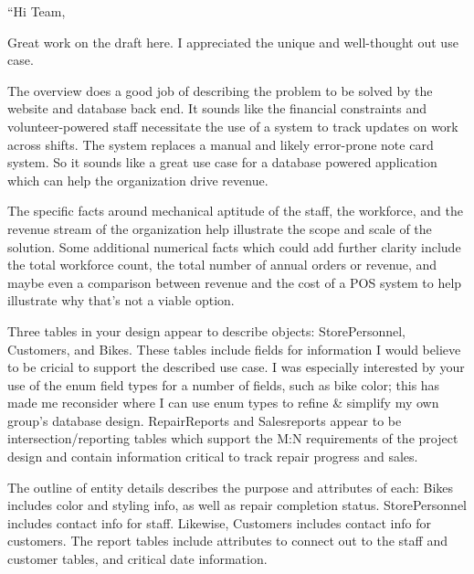\documentclass{article}
\begin{document}
\begin{tcolorbox}[colback=secondarycolor, colframe=primarycolor, title=\textbf{Step 1: Peer Review 2 - Andrew Mathena}]
``Hi Team,

\vspace{0.2cm}

Great work on the draft here. I appreciated the unique and well-thought out use case. 

\vspace{0.2cm}

The overview does a good job of describing the problem to be solved by the website and database back end. It sounds like the financial constraints and volunteer-powered staff necessitate the use of a system to track updates on work across shifts. The system replaces a manual and likely error-prone note card system. So it sounds like a great use case for a database powered application which can help the organization drive revenue.

\vspace{0.2cm}

The specific facts around mechanical aptitude of the staff, the workforce, and the revenue stream of the organization help illustrate the scope and scale of the solution. Some additional numerical facts which could add further clarity include the total workforce count, the total number of annual orders or revenue, and maybe even a comparison between revenue and the cost of a POS system to help illustrate why that's not a viable option.

\vspace{0.2cm}

Three tables in your design appear to describe objects: StorePersonnel, Customers, and Bikes. These tables include fields for information I would believe to be cricial to support the described use case. I was especially interested by your use of the enum field types for a number of fields, such as bike color; this has made me reconsider where I can use enum types to refine \& simplify my own group's database design. RepairReports and Salesreports appear to be intersection/reporting tables which support the M:N requirements of the project design and contain information critical to track repair progress and sales.

\vspace{0.2cm}

The outline of entity details describes the purpose and attributes of each: Bikes includes color and styling info, as well as repair completion status. StorePersonnel includes contact info for staff. Likewise, Customers includes contact info for customers. The report tables include attributes to connect out to the staff and customer tables, and critical date information.


\end{tcolorbox}
\end{document}
